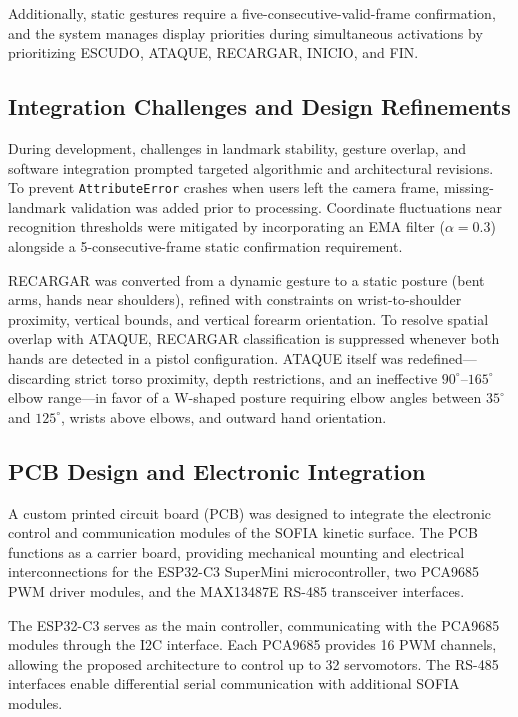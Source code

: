 \documentclass[lettersize,journal]{IEEEtran}
\begin{document}
	Additionally, static gestures require a five-consecutive-valid-frame confirmation, and the system manages display priorities during simultaneous activations by prioritizing ESCUDO, ATAQUE, RECARGAR, INICIO, and FIN.
	
	\subsection{Integration Challenges and Design Refinements}
	
	During development, challenges in landmark stability, gesture overlap, and software integration prompted targeted algorithmic and architectural revisions. To prevent \texttt{AttributeError} crashes when users left the camera frame, missing-landmark validation was added prior to processing. Coordinate fluctuations near recognition thresholds were mitigated by incorporating an EMA filter ($\alpha = 0.3$) alongside a 5-consecutive-frame static confirmation requirement.
	
	RECARGAR was converted from a dynamic gesture to a static posture (bent arms, hands near shoulders), refined with constraints on wrist-to-shoulder proximity, vertical bounds, and vertical forearm orientation. 
	To resolve spatial overlap with ATAQUE, RECARGAR classification is suppressed whenever both hands are detected in a pistol configuration. ATAQUE itself was redefined—discarding strict torso proximity, depth restrictions, and an ineffective $90^\circ$–$165^\circ$ elbow range—in favor of a W-shaped posture requiring elbow angles between $35^\circ$ and $125^\circ$, wrists above elbows, and outward hand orientation.
	
	\subsection{PCB Design and Electronic Integration}
	\label{subsec:pcb_design}
	
	A custom printed circuit board (PCB) was designed
	to integrate the electronic control and communication
	modules of the SOFIA kinetic surface. The PCB
	functions as a carrier board, providing mechanical
	mounting and electrical interconnections for the
	ESP32-C3 SuperMini microcontroller, two PCA9685
	PWM driver modules, and the MAX13487E RS-485
	transceiver interfaces.
	
	The ESP32-C3 serves as the main controller,
	communicating with the PCA9685 modules through
	the I2C interface. Each PCA9685 provides 16 PWM
	channels, allowing the proposed architecture to
	control up to 32 servomotors. The RS-485 interfaces
	enable differential serial communication with
	additional SOFIA modules.
	
\end{document}
